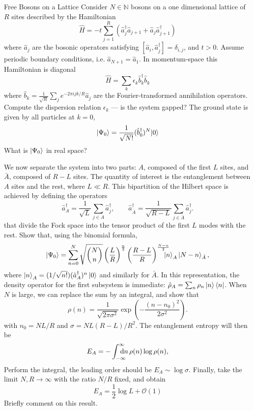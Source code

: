 \documentclass[a4paper,10pt,twoside]{article}
\def \dd {{\rm d}}
\def \order {\mathcal{O}}
\def\bquad{\mkern-18mu}
\begin{document}
\begin{section}{Free Bosons on a Lattice}
Consider $N \in \mathbb{N}$ bosons on a one dimensional lattice of $R$ sites described by the Hamiltonian
\[
  \hat{H} = -t\sum_{j=1}^R \left( \hat{a}_j^\dag \hat{a}_{j+1} + \hat{a}_j \hat{a}_{j+1}^\dag \right)
\]
where $\hat{a}_j$  are the bosonic operators satisfying $[\hat{a}_i,\hat{a}_j^\dag] = \delta_{i,j}$, and $t > 0$. Assume periodic boundary conditions, i.e. $\hat{a}_{N+1} = \hat{a}_1$.
In momentum-space this Hamiltonian is diagonal
\[
  \hat{H} = \sum_k \epsilon_k \hat{b}_k^\dag \hat{b}_k
\]
where $\hat{b}_k = \frac{1}{\sqrt{R}} \sum_j e^{-2\pi ijk/R}\hat{a}_j$ are the Fourier-transformed annihilation operators.
Compute the dispersion relation $\epsilon_k$ --- is the system gapped?
The ground state is given by all particles at $k=0$,
\[
  \ket{\Psi_0} = \frac{1}{\sqrt{N!}} (\hat{b}_0^\dag)^N \! \ket{0}
\]
What is $\ket{\Psi_0}$ in real space?

 
We now separate the system into two parts: $A$, composed of the first $L$ sites, and $\bar{A}$, composed of $R-L$ sites.
The quantity of interest is the entanglement between $A$ sites and the rest, where $ L \ll R$.
This bipartition of the Hilbert space is achieved by defining the operators
\[
  \hat{a}_A^\dag = \frac{1}{\sqrt{L}} \sum_{j \in A} \hat{a}_j^\dag, \qquad  \hat{a}_{\bar{A}}^\dag = \frac{1}{\sqrt{R -L}} \sum_{j \in \bar{A}} \hat{a}_j^\dag .
\]
that divide the Fock space into the tensor product of the first $L$ modes with the rest.
Show that, using the binomial formula, 
\[ 
  \ket{\Psi_0} = \sum_{n=0}^N \sqrt{{N\choose n}} \left(\frac{L}{R}\right)^{\frac{n}{2}} \left(\frac{R-L}{R}\right)^{\frac{N-n}{2}} \bquad \ket{n}_A\ket{N-n}_{\bar{A}},
\]
where $\ket{n}_A = (1/\sqrt{n!}) (\hat{a}_A^\dag)^n \ket{0}$ and similarly for $\bar{A}$.
In this representation, the density operator for the first subsystem is immediate: $\hat{\rho}_A = \sum_n \rho_n \ket{n}\bra{n}$.
When $N$ is large, we can replace the sum by an integral, and show that 
\[
  \rho(n) = \frac{1}{\sqrt{2 \pi \sigma^2}} \exp{\left( -\frac{(n-n_0)^2}{2\sigma^2}\right)} .
\]
with $n_0 = NL/R$ and $\sigma = NL(R-L)/R^2$.
The entanglement entropy will then be 
\[
  E_A = - \int_{-\infty}^\infty \bquad \dd n \, \rho(n) \log \rho(n) ,
\]
Perform the integral, the leading order should be $E_A \sim \log \sigma$. 
Finally, take the limit $N,R \to \infty$ with the ratio $N/R$ fixed, and obtain 
\[
  E_A = \frac{1}{2}\log L + \order(1)
\]
Briefly comment on this result.
\end{section}
\end{document}
